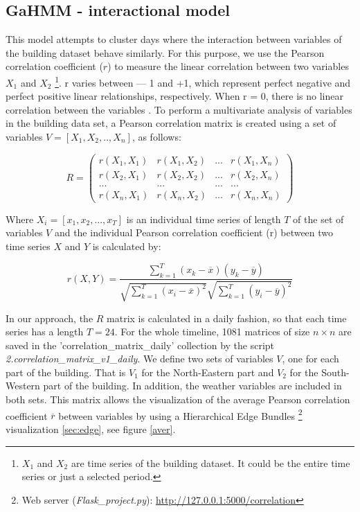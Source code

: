 \subsection{GaHMM - interactional model}
\label{sec:interactional_model}

This model attempts to cluster days where the interaction between variables of the building dataset behave similarly. For this purpose, we use the Pearson correlation coefficient ($r$) to measure the linear correlation between two variables $X_1$ and $X_2$ \footnote{$X_1$ and $X_2$ are time series of the building dataset. It could be the entire time series or just a selected period.}. r varies between — 1 and +1, which represent perfect negative and perfect positive linear relationships, respectively. When r = 0, there is no linear correlation between the variables \cite{cohen2013applied}. To perform a multivariate analysis of variables in the building data set, a Pearson correlation matrix is created using a set of variables $V = [X_1, X_2, .., X_n]$, as follows: 

\begin{equation}
R = 
\begin{pmatrix} r(X_1,X_1) &  r(X_1,X_2) & ... & r(X_1,X_n) \\ 
				r(X_2,X_1) &  r(X_2,X_2) & ... & r(X_2,X_n) \\
				...        &  ...        & ... & ... \\ 
				r(X_n,X_1) &  r(X_n,X_2) & ... & r(X_n,X_n)\end{pmatrix} 
\end{equation}

Where $X_i = [x_1, x_2, ..., x_T]$ is an individual time series of length $T$ of the set of variables $V$ and the individual Pearson correlation coefficient (r) between two time series $X$ and $Y$ is calculated by:

\begin{equation}
r(X,Y) =  \dfrac{\sum_{k=1}^T (x_k - \overline{x})(y_k - \overline{y})}{ \sqrt{\sum_{k=1}^T (x_i - \overline{x})^2} \sqrt{\sum_{k=1}^T (y_i - \overline{y})^2} }
\end{equation}

In our approach, the $R$ matrix is calculated in a daily fashion, so that each time series has a length $T=24$. For the whole timeline, 1081 matrices of size $n \times n$ are saved in the 'correlation\_matrix\_daily' collection by the script \textit{2.correlation\_matrix\_v1\_daily}. We define two sets of variables $V$, one for each part of the building. That is $V_1$ for the North-Eastern part and $V_2$ for the South-Western part of the building. In addition, the weather variables are included in both sets. This matrix allows the visualization of the average Pearson correlation coefficient $\overline{r}$ between variables by using a Hierarchical Edge Bundles \footnote{Web server (\textit{Flask\_project.py}): \url{http://127.0.0.1:5000/correlation}} visualization \ref{sec:edge}, see figure \ref{aver}.


